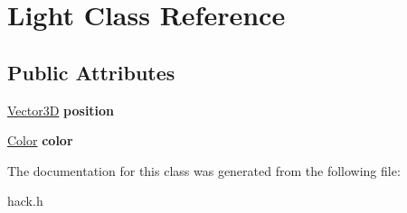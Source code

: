 \hypertarget{class_light}{\section{Light Class Reference}
\label{class_light}
}
\subsection*{Public Attributes}
\begin{DoxyCompactItemize}
\item 
\hypertarget{class_light_a3a4fe35c2d1ce18e97c51ace85e2bcd0}{\hyperlink{class_vector3_d}{Vector3\-D} {\bfseries position}}\label{class_light_a3a4fe35c2d1ce18e97c51ace85e2bcd0}

\item 
\hypertarget{class_light_ad7a168d26aed1bf7cca1a8d8e6f8ada4}{\hyperlink{class_color}{Color} {\bfseries color}}\label{class_light_ad7a168d26aed1bf7cca1a8d8e6f8ada4}

\end{DoxyCompactItemize}


The documentation for this class was generated from the following file\-:\begin{DoxyCompactItemize}
\item 
hack.\-h\end{DoxyCompactItemize}
